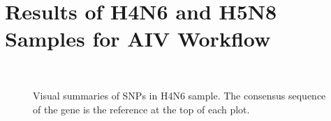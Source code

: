 \section*{\thesection \quad Results of H4N6 and H5N8 Samples for AIV Workflow}

\begin{figure}
    \centering
     \\
    \caption[Visual summaries of SNPs in H4N6 sample.]{Visual summaries of SNPs in H4N6 sample. The consensus sequence of the gene is the reference at the top of each plot.}
\label{fig:apx-aiv-snipit-s4}
\end{figure}

